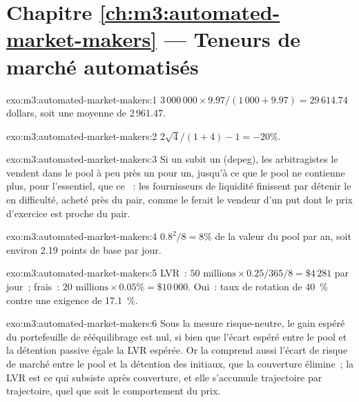 \section*{Chapitre \ref{ch:m3:automated-market-makers} --- Teneurs de marché automatisés}

\begin{solution}{exo:m3:automated-market-makers:1}
$3\,000\,000 \times 9.97/(1\,000 + 9.97) = 29\,614.74$ dollars, soit une moyenne de 2\,961.47.
\end{solution}

\begin{solution}{exo:m3:automated-market-makers:2}
$2\sqrt4/(1 + 4) - 1 = -20\%$.
\end{solution}

\begin{solution}{exo:m3:automated-market-makers:3}
Si un  subit un  (depeg), les arbitragistes le vendent dans le pool à peu près un pour un, jusqu'à ce que le pool ne contienne plus, pour l'essentiel, que ce ~: les
fournisseurs de liquidité finissent par détenir le  en difficulté, acheté près du pair, comme le ferait le vendeur d'un put dont le prix d'exercice est proche du pair.
\end{solution}

\begin{solution}{exo:m3:automated-market-makers:4}
$0.8^2/8 = 8\%$ de la valeur du pool par an, soit environ 2.19 points de base par jour.
\end{solution}

\begin{solution}{exo:m3:automated-market-makers:5}
LVR~: $50\text{ millions} \times 0.25/365/8 = \$4\,281$ par jour~; frais~: $20\text{ millions} \times 0.05\% = \$10\,000$. Oui~: taux de rotation de
40~\% contre une exigence de 17.1~\%.
\end{solution}

\begin{solution}{exo:m3:automated-market-makers:6}
Sous la mesure risque-neutre, le gain espéré du portefeuille de rééquilibrage est nul, si bien que l'écart espéré entre le pool et la détention
passive égale la LVR espérée. Or la  comprend aussi l'écart de risque de marché entre le pool et la détention des  initiaux,
que la couverture élimine~; la LVR est ce qui subsiste après couverture, et elle s'accumule trajectoire par trajectoire, quel que soit le comportement du prix.
\end{solution}

